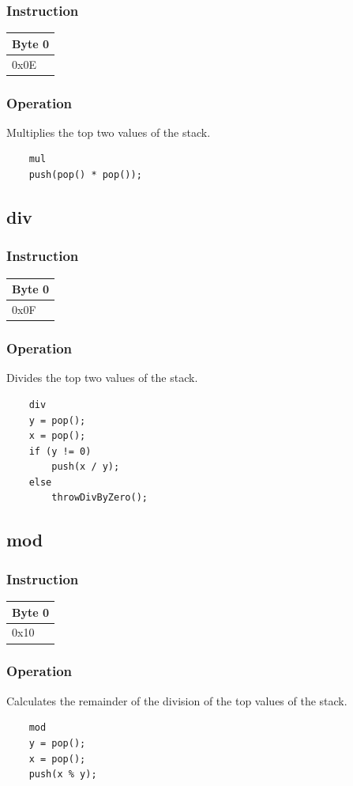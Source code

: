 \documentclass[11pt]{report}
\newcommand{\onebyteinstruction}[1]{
\begin{tabular}{|p{3.9em}|}
\hline
\tiny{Byte 0} \\ \hline
#1  \\ \hline
\end{tabular}
}
\begin{document}
\subsubsection{Instruction}
\onebyteinstruction{0x0E}

\subsubsection{Operation}
Multiplies the top two values of the stack.

	\begin{lstlisting}
	mul
	push(pop() * pop());
	\end{lstlisting}

\subsection{div}
\subsubsection{Instruction}
\onebyteinstruction{0x0F}

\subsubsection{Operation}
Divides the top two values of the stack.

	\begin{lstlisting}
	div
	y = pop();
	x = pop();
	if (y != 0)
		push(x / y);
	else
		throwDivByZero();
	\end{lstlisting}

\subsection{mod}
\subsubsection{Instruction}
\onebyteinstruction{0x10}

\subsubsection{Operation}
Calculates the remainder of the division of the top values of the stack.

	\begin{lstlisting}
	mod
	y = pop();
	x = pop();
	push(x % y);
	\end{lstlisting}
\end{document}

